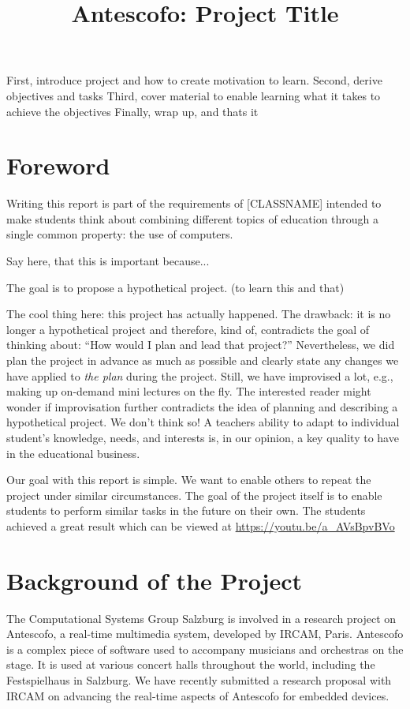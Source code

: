 \documentclass[onecolumn,nocopyrightspace,preprint]{sigplanconf}
\title{Antescofo: Project Title}
\begin{document}
\maketitle


First, introduce project and how to create motivation to learn.
Second, derive objectives and tasks
Third, cover material to enable learning what it takes to achieve the objectives
Finally, wrap up, and thats it


\section{Foreword} 
Writing this report is part of the requirements of [CLASSNAME] intended to
make students think about combining different topics of education through
a single common property: the use of computers.


Say here, that this is important because...

The goal is to propose a hypothetical project. (to learn this and that)

The cool thing here: this project has actually happened. The drawback: it is
no longer a hypothetical project and therefore, kind of, contradicts the goal
of thinking about: ``How would I plan and lead that project?'' Nevertheless,
we did plan the project in advance as much as possible and clearly state any
changes we have applied  to \textit{the plan} during the project. Still, we
have improvised a lot, e.g., making up on-demand mini lectures on the fly. The
interested reader might wonder if improvisation further contradicts the idea
of planning and describing a hypothetical project.  We don't think so! A
teachers ability to adapt to individual student's knowledge, needs, and
interests is, in our opinion, a key quality to have in the educational
business.

Our goal with this report is simple. We want to enable others to repeat the
project under similar circumstances. The goal of the project itself is to
enable students to perform similar tasks in the future on their own.  The
students achieved a great result which can be viewed at
\url{https://youtu.be/a_AVsBpvBVo}

\section{Background of the Project}\label{sec:background}

The Computational Systems Group Salzburg is involved in a research
project on Antescofo, a real-time multimedia system, developed by IRCAM,
Paris. Antescofo is a complex piece of software used to accompany musicians
and orchestras on the stage. It is used at various concert halls throughout
the world, including the Festspielhaus in Salzburg. We have recently submitted
a research proposal with IRCAM on advancing the real-time aspects of Antescofo
for embedded devices.
\end{document}
